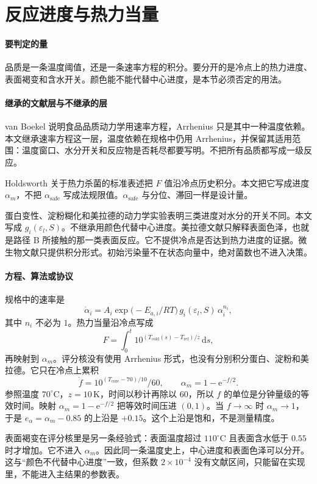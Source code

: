 \section{反应进度与热力当量}

\paragraph{要判定的量}
品质是一条温度阈值，还是一条速率方程的积分。要分开的是冷点上的热力进度、表面褐变和含水开关。颜色能不能代替中心进度，是本节必须否定的用法。

\paragraph{继承的文献层与不继承的层}
van Boekel 说明食品品质动力学用速率方程，Arrhenius 只是其中一种温度依赖\cite{vanboekel2008}。本文继承速率方程这一层，温度依赖在规格中仍用 Arrhenius，并保留其适用范围：温度窗口、水分开关和反应物是否耗尽都要写明。不把所有品质都写成一级反应。

Holdsworth 关于热力杀菌的标准表述把 $F$ 值沿冷点历史积分\cite{holdsworth1997}。本文把它写成进度 $\alpha_m$，不把 $\alpha_{\mathrm{safe}}$ 写成法规限值。$\alpha_{\mathrm{safe}}$ 与分位、滞回一样是设计量。

蛋白变性、淀粉糊化和美拉德的动力学实验表明三类进度对水分的开关不同。本文写成 $g_i(\varepsilon_l,S)$。不继承用颜色代替中心进度。美拉德文献只解释表面色泽，也就是路径 B 所接触的那一类表面反应。它不提供冷点是否达到热力进度的证据。微生物文献只提供积分形式。初始污染量不在状态向量中，绝对菌数也不进入决策。

\paragraph{方程、算法或协议}
规格中的速率是
\[
\dot\alpha_i=A_i\exp\big(-E_{a,i}/RT\big)\,g_i(\varepsilon_l,S)\,\alpha_i^{n_i},
\]
其中 $n_i$ 不必为 $1$。热力当量沿冷点写成
\[
F=\int_0^t 10^{(T_{\mathrm{cold}}(s)-T_{\mathrm{ref}})/z}\,\mathrm{d}s,
\]
再映射到 $\alpha_m$。评分核没有使用 Arrhenius 形式，也没有分别积分蛋白、淀粉和美拉德。它只在冷点上累积
\[
\dot f=10^{(T_{\mathrm{core}}-70)/10}/60,\qquad\alpha_m=1-\mathrm{e}^{-f/2}.
\]
参照温度 $70^\circ\mathrm{C}$，$z=10\,\mathrm{K}$，时间以秒计再除以 $60$，所以 $f$ 的单位是分钟量级的等效时间。映射 $\alpha_m=1-\mathrm{e}^{-f/2}$ 把等效时间压进 $(0,1)$。当 $f\to\infty$ 时 $\alpha_m\to 1$，于是 $e_\alpha=\alpha_m-0.85$ 的上沿是 $+0.15$。这个上沿是饱和，不是测量精度。

表面褐变在评分核里是另一条经验式：表面温度超过 $110^\circ\mathrm{C}$ 且表面含水低于 $0.55$ 时才增加。它不进入 $\alpha_m$。因此同一条温度史上，中心进度和表面色泽可以分开。这与“颜色不代替中心进度”一致，但系数 $2\times 10^{-4}$ 没有文献区间，只能留在实现里，不能进入主结果的参数表。


